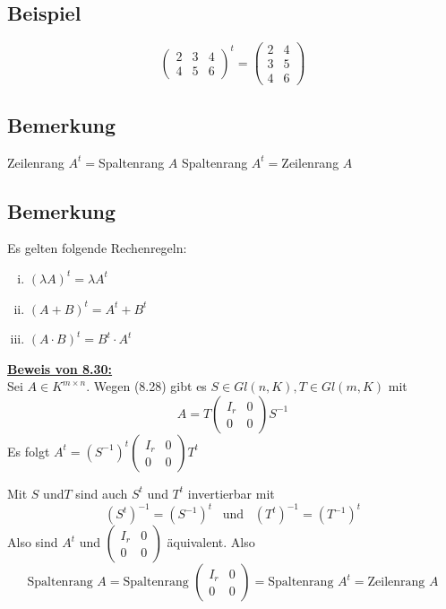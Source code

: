 \subsection{Beispiel} %
\label{sub:beispiel}
\[
	\begin{pmatrix}
		2 & 3 & 4 \\
		4 & 5 & 6
	\end{pmatrix}^t = 
	\begin{pmatrix}
		2 & 4 \\
		3 & 5 \\
		4 & 6
	\end{pmatrix}
\]

\subsection{Bemerkung} %
\label{sub:bemerkung}
Zeilenrang $A^t = $Spaltenrang $A$ \quad Spaltenrang $A^t = $Zeilenrang $A$

\subsection{Bemerkung} %
\label{sub:bemerkung}
Es gelten folgende Rechenregeln:
\begin{enumerate}[(i)]
	\item $(\lambda A)^t = \lambda A^t$
	\item $(A+B)^t = A^t + B^t$
	\item $(A \cdot B)^t = B^t \cdot A^t$
\end{enumerate}
\vspace{\baselineskip} 
\underline{\textbf{Beweis von 8.30:}} \\
Sei $A \in K^{m \times n}$. Wegen (8.28) gibt es $S \in Gl (n,K), T \in Gl(m,K)$ mit 
\[
	A=T  \begin{pmatrix}
		I_r & 0 \\
		0 & 0
	\end{pmatrix} S^{-1}
\]
Es folgt $A^t= (S^{-1})^t \begin{pmatrix}
		I_r & 0 \\
		0 & 0
	\end{pmatrix}  T^t$ 
	
Mit $S$ und$T$ sind auch $S^t$ und $T^t$ invertierbar mit 
\[
	(S^t)^{-1}= (S^{-1})^t \enspace \text{ und } \enspace (T^t)^{-1} = (T^{-1})^t
\]
Also sind $A^t$ und $ \left (\begin{smallmatrix}
	I_r & 0 \\
	0 & 0
\end{smallmatrix} \right)$ äquivalent.
 Also 
 \[
 	\text{Spaltenrang }A = \text{Spaltenrang } \left (\begin{smallmatrix}
	I_r & 0 \\
	0 & 0
\end{smallmatrix} \right) = \text{Spaltenrang }A^t = \text{Zeilenrang } A
 \]

